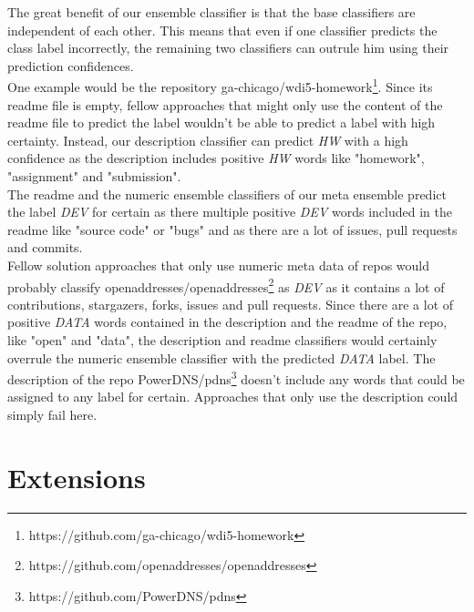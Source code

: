 \documentclass[%
a4paper,
DIV12,
2.5headlines,
bigheadings,
titlepage,
openbib,
]{scrartcl}
\begin{document}
The great benefit of our ensemble classifier is that the base classifiers are independent of each other.
This means that even if one classifier predicts the class label incorrectly, the remaining two classifiers can outrule him using their prediction confidences.\\
One example would be the repository ga-chicago/wdi5-homework\footnote{https://github.com/ga-chicago/wdi5-homework}.
Since its readme file is empty, fellow approaches that might only use the content of the readme file to predict the label wouldn't be able to predict a label with high certainty.
Instead, our description classifier can predict \textit{HW} with a high confidence as the description includes positive \textit{HW} words like "homework", "assignment" and "submission".\\
The readme and the numeric ensemble classifiers of our meta ensemble predict the label \textit{DEV} for certain as there multiple positive \textit{DEV} words included in the readme like "source code" or "bugs" and as there are a lot of issues, pull requests and commits.\\
Fellow solution approaches that only use numeric meta data of repos would probably classify openaddresses/openaddresses\footnote{https://github.com/openaddresses/openaddresses} as \textit{DEV} as it contains a lot of contributions, stargazers, forks, issues and pull requests.
Since there are a lot of positive \textit{DATA} words contained in the description and the readme of the repo, like "open" and "data", the description and readme classifiers would certainly overrule the numeric ensemble classifier with the predicted \textit{DATA} label.
The description of the repo PowerDNS/pdns\footnote{https://github.com/PowerDNS/pdns} doesn't include any words that could be assigned to any label for certain.
Approaches that only use the description could simply fail here.

\section{Extensions}\label{extensions}
\end{document}

